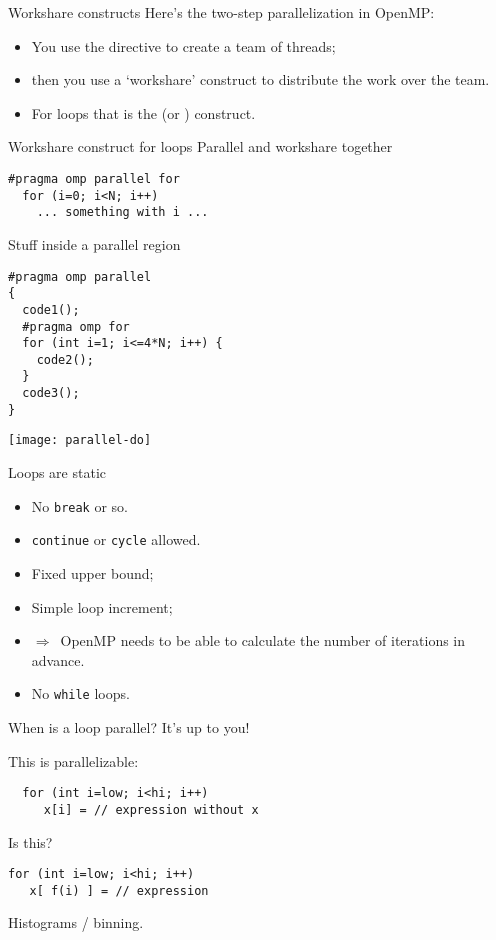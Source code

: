 \begin{numberedframe}{Workshare constructs}
  Here's the two-step parallelization in OpenMP:
  \begin{itemize}
  \item You use the  directive to create a team of
    threads;
  \item then you use a `workshare' construct to distribute the
    work over the team.
  \item For loops that is the  (or ) construct.
  \end{itemize}
\end{numberedframe}

\begin{numberedframe}{Workshare construct for loops}
Parallel and workshare together
\begin{lstlisting}
#pragma omp parallel for
  for (i=0; i<N; i++)
    ... something with i ...
\end{lstlisting}
\end{numberedframe}

\begin{numberedframe}{Stuff inside a parallel region}
\begin{multicols}{2}  
\begin{lstlisting}
#pragma omp parallel
{
  code1();
  #pragma omp for
  for (int i=1; i<=4*N; i++) {
    code2();
  }
  code3();
}
\end{lstlisting}
\columnbreak
\texttt{[image: parallel-do]}
\end{multicols}
\end{numberedframe}

\begin{numberedframe}{Loops are static}
  \begin{itemize}
  \item No \lstinline{break} or so.
  \item \lstinline{continue} or \lstinline{cycle} allowed.
  \item Fixed upper bound;
  \item Simple loop increment;
  \item $\Rightarrow$~OpenMP needs to be able to calculate
    the number of iterations in advance.
  \item No \lstinline{while} loops.
  \end{itemize}
\end{numberedframe}

\begin{numberedframe}{When is a loop parallel?}
  It's up to you!

  This is parallelizable:
\begin{lstlisting}
  for (int i=low; i<hi; i++)
     x[i] = // expression without x
\end{lstlisting}
Is this?
\begin{lstlisting}
for (int i=low; i<hi; i++)
   x[ f(i) ] = // expression
\end{lstlisting}
Histograms / binning.
\end{numberedframe}

